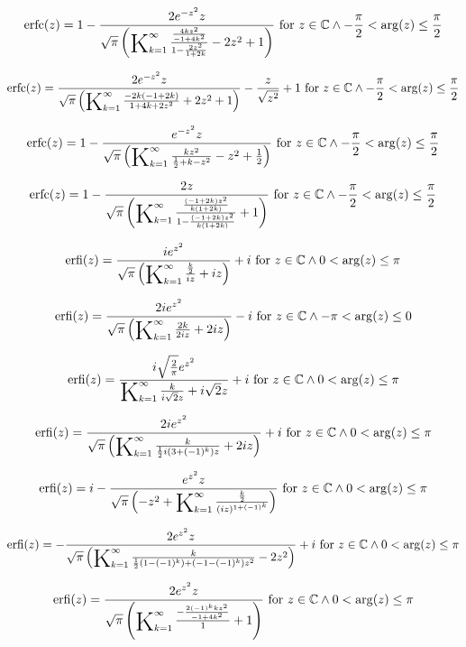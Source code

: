 \documentclass{article}
\newcommand{\bigK}{\mathop{\raisebox{-5pt}{\huge K}}}
\begin{document}
\[\text{erfc}(z)=1-\frac{2 e^{-z^2} z}{\sqrt{\pi } \left(\bigK_{k=1}^{\infty}\frac{\frac{4 k z^2}{-1+4 k^2}}{1-\frac{2 z^2}{1+2 k}}-2 z^2+1\right)}\text{ for }z\in \mathbb{C}\land -\frac{\pi }{2}<\arg (z)\leq \frac{\pi }{2}\] 

\[\text{erfc}(z)=\frac{2 e^{-z^2} z}{\sqrt{\pi } \left(\bigK_{k=1}^{\infty}\frac{-2 k (-1+2 k)}{1+4 k+2 z^2}+2 z^2+1\right)}-\frac{z}{\sqrt{z^2}}+1\text{ for }z\in \mathbb{C}\land -\frac{\pi }{2}<\arg (z)\leq \frac{\pi }{2}\] 

\[\text{erfc}(z)=1-\frac{e^{-z^2} z}{\sqrt{\pi } \left(\bigK_{k=1}^{\infty}\frac{k z^2}{\frac{1}{2}+k-z^2}-z^2+\frac{1}{2}\right)}\text{ for }z\in \mathbb{C}\land -\frac{\pi }{2}<\arg (z)\leq \frac{\pi }{2}\] 

\[\text{erfc}(z)=1-\frac{2 z}{\sqrt{\pi } \left(\bigK_{k=1}^{\infty}\frac{\frac{(-1+2 k) z^2}{k (1+2 k)}}{1-\frac{(-1+2 k) z^2}{k (1+2 k)}}+1\right)}\text{ for }z\in \mathbb{C}\land -\frac{\pi }{2}<\arg (z)\leq \frac{\pi }{2}\] 

\[\text{erfi}(z)=\frac{i e^{z^2}}{\sqrt{\pi } \left(\bigK_{k=1}^{\infty}\frac{\frac{k}{2}}{i z}+i z\right)}+i\text{ for }z\in \mathbb{C}\land 0<\arg (z)\leq \pi\] 

\[\text{erfi}(z)=\frac{2 i e^{z^2}}{\sqrt{\pi } \left(\bigK_{k=1}^{\infty}\frac{2 k}{2 i z}+2 i z\right)}-i\text{ for }z\in \mathbb{C}\land -\pi <\arg (z)\leq 0\] 

\[\text{erfi}(z)=\frac{i \sqrt{\frac{2}{\pi }} e^{z^2}}{\bigK_{k=1}^{\infty}\frac{k}{i \sqrt{2} z}+i \sqrt{2} z}+i\text{ for }z\in \mathbb{C}\land 0<\arg (z)\leq \pi\] 

\[\text{erfi}(z)=\frac{2 i e^{z^2}}{\sqrt{\pi } \left(\bigK_{k=1}^{\infty}\frac{k}{\frac{1}{2} i \left(3+(-1)^k\right) z}+2 i z\right)}+i\text{ for }z\in \mathbb{C}\land 0<\arg (z)\leq \pi\] 

\[\text{erfi}(z)=i-\frac{e^{z^2} z}{\sqrt{\pi } \left(-z^2+\bigK_{k=1}^{\infty}\frac{\frac{k}{2}}{(i z)^{1+(-1)^k}}\right)}\text{ for }z\in \mathbb{C}\land 0<\arg (z)\leq \pi\] 

\[\text{erfi}(z)=-\frac{2 e^{z^2} z}{\sqrt{\pi } \left(\bigK_{k=1}^{\infty}\frac{k}{\frac{1}{2} \left(1-(-1)^k\right)+\left(-1-(-1)^k\right) z^2}-2 z^2\right)}+i\text{ for }z\in \mathbb{C}\land 0<\arg (z)\leq \pi\] 

\[\text{erfi}(z)=\frac{2 e^{z^2} z}{\sqrt{\pi } \left(\bigK_{k=1}^{\infty}\frac{-\frac{2 (-1)^k k z^2}{-1+4 k^2}}{1}+1\right)}\text{ for }z\in \mathbb{C}\land 0<\arg (z)\leq \pi\] 
\end{document}

